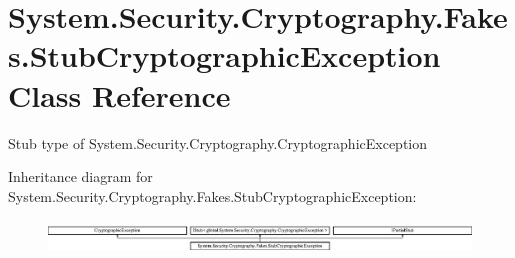 \hypertarget{class_system_1_1_security_1_1_cryptography_1_1_fakes_1_1_stub_cryptographic_exception}{\section{System.\-Security.\-Cryptography.\-Fakes.\-Stub\-Cryptographic\-Exception Class Reference}
\label{class_system_1_1_security_1_1_cryptography_1_1_fakes_1_1_stub_cryptographic_exception}
}


Stub type of System.\-Security.\-Cryptography.\-Cryptographic\-Exception 


Inheritance diagram for System.\-Security.\-Cryptography.\-Fakes.\-Stub\-Cryptographic\-Exception\-:\begin{figure}[H]
\begin{center}
\leavevmode
\includegraphics[height=0.882585cm]{class_system_1_1_security_1_1_cryptography_1_1_fakes_1_1_stub_cryptographic_exception}
\end{center}
\end{figure}

